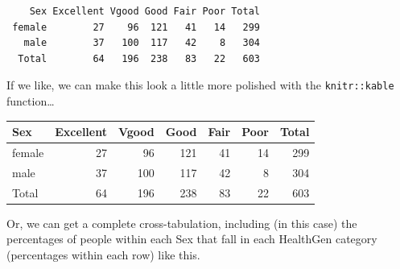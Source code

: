 \documentclass[
]{book}
\newenvironment{Shaded}{\begin{snugshade}}{\end{snugshade}}
\newcommand{\KeywordTok}[1]{\textcolor[rgb]{0.13,0.29,0.53}{\textbf{#1}}}
\newcommand{\NormalTok}[1]{#1}
\newcommand{\OperatorTok}[1]{\textcolor[rgb]{0.81,0.36,0.00}{\textbf{#1}}}
\newcommand{\StringTok}[1]{\textcolor[rgb]{0.31,0.60,0.02}{#1}}
\begin{document}
\begin{Shaded}
\end{Shaded}

\begin{verbatim}
    Sex Excellent Vgood Good Fair Poor Total
 female        27    96  121   41   14   299
   male        37   100  117   42    8   304
  Total        64   196  238   83   22   603
\end{verbatim}

If we like, we can make this look a little more polished with the \texttt{knitr::kable} function\ldots{}

\begin{Shaded}
\end{Shaded}

\begin{tabular}{l|r|r|r|r|r|r}
\hline
Sex & Excellent & Vgood & Good & Fair & Poor & Total\\
\hline
female & 27 & 96 & 121 & 41 & 14 & 299\\
\hline
male & 37 & 100 & 117 & 42 & 8 & 304\\
\hline
Total & 64 & 196 & 238 & 83 & 22 & 603\\
\hline
\end{tabular}

Or, we can get a complete cross-tabulation, including (in this case) the percentages of people within each Sex that fall in each HealthGen category (percentages within each row) like this.

\begin{Shaded}
\end{Shaded}
\end{document}
